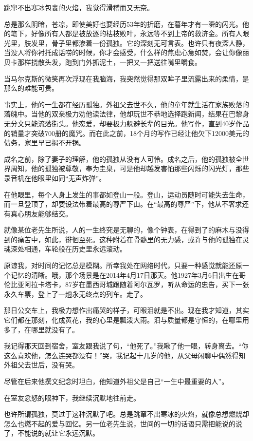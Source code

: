 \documentclass[openany,scheme = chinese, linespread = 1.5]{ctexbook}
\begin{document}
跳窜不出寒冰包裹的火焰，我觉得滑稽而又无奈。

总是那么阴暗，苍凉，即使美好也要经历53年的折磨，在暮年才有一瞬的闪光。他的笔下，好像所有人都是被放逐的枯枝败叶，永远等不到上帝的救济金。所有人眼光里，肤发里，骨子里都渗着一份孤独。它的深刻无可言表。也许只有夜深人静，当没人将你衬托成话唠的时候，你才会感受，什么样的焦虑心急如焚，会让你像丽贝卡那样挠散头发，跑到门外抓泥土，一把又一把送往嘴里嚼食。

当马尔克斯的微笑再次浮现在我脑海，我突然觉得那双眸子里流露出来的柔情，是那么的难能可贵。

事实上，他的一生都在经历孤独。外祖父去世不久，他的童年就生活在家族败落的落魄中。当他的双亲极力劝他读法律，他却玩世不恭地选择跑新闻，结果在巴黎身无分文只能流落街头。他恋爱，却要极力躲避长辈的目光。他写作，直到40岁作品的销量才突破700册的魔咒。而在此之前，18个月的写作已经让他欠下12000美元的债务，家里早已揭不开锅。

成名之前，除了妻子的理解，他的孤独从没有人可怜。成名之后，他的孤独被全世界周知，他的孤独被尊敬，奉为圭臬，可是他却越发害怕那些闪烁的闪光灯，那些录音机在他眼里如同“无声炸弹”。

在他眼里，每个人身上发生的事都如登山一般。登山，运动员随时可能失去生命，而一旦登顶了，却要设法带着最高的尊严下山。在“最高的尊严”下，他从不奢求还有真心朋友能够结交。

就像某位老先生所说，人的一生终究是无聊的，像个钟表，在得到了的麻木与没得到的痛苦中，如此，徘徊至死。这种附着在骨髓里的无力感，或许与他的孤独在灵魂深处相通，车轮般在历史里永远滚动。

原谅我，对时间的记忆总是模糊。所幸我处在网络时代，只要一种感觉就能还原一个记忆的清晰。哦，那个场景是在2014年4月17日那天。他1927年3月6日出生在哥伦比亚阿拉卡塔卡，87岁在墨西哥城跟随着阿尔瓦罗，听从命运的忠告，买下一张永久车票，登上了一趟永无终点的列车。走了。

那日公交车上，我极力想作出痛哭的样子，可眼泪就是不出。现在我才知道，其实它们都在那刻，化成黄花，我的心里是瓢泼大雨。泪与质量都是守恒的，在哪里用多了，在哪里就没有了。

我记得那天回到宿舍，室友跟我说了句，“他死了。”我瞅了他一眼，转身离去。“你这么喜欢他，怎么连哭都没有！”哭，我记起十几岁的他，从父母闲聊中偶然得知外祖父去世后，没有哭。

尽管在后来他撰文纪念时坦白，他知道外祖父是自己“一生中最重要的人”。

在室友忿怒的眼神下，我继续沉默地往前走。

也许所谓孤独，莫过于这种沉默了吧。总是跳窜不出寒冰的火焰，就像总想燃烧却怎么也燃不起的爱与回忆。另一位老先生说，世间的一切的话语只需把能说的说了，不能说的就让它永远沉默。
\end{document}

